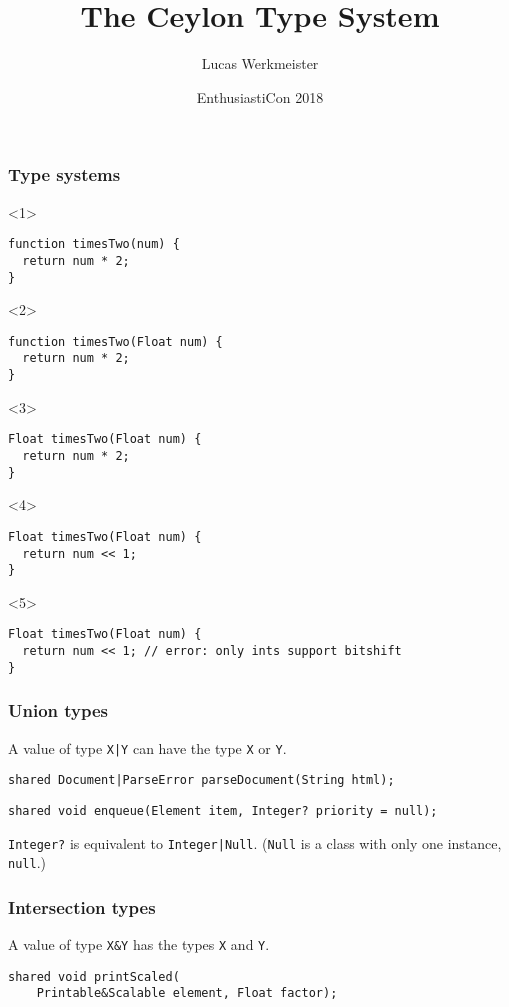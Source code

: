 \documentclass[aspectratio=169]{beamer}
\title{The Ceylon Type System}
\author{Lucas Werkmeister}
\date{EnthusiastiCon 2018}
\begin{document}
\frame{\titlepage}

\begin{frame}[fragile]
  \frametitle{Type systems}
  \begin{onlyenv}<1>
    \begin{lstlisting}
function timesTwo(num) {
  return num * 2;
}
    \end{lstlisting}
  \end{onlyenv}
  \begin{onlyenv}<2>
    \begin{lstlisting}
function timesTwo(Float num) {
  return num * 2;
}
    \end{lstlisting}
  \end{onlyenv}
  \begin{onlyenv}<3>
    \begin{lstlisting}
Float timesTwo(Float num) {
  return num * 2;
}
    \end{lstlisting}
  \end{onlyenv}
  \begin{onlyenv}<4>
    \begin{lstlisting}
Float timesTwo(Float num) {
  return num << 1;
}
    \end{lstlisting}
  \end{onlyenv}
  \begin{onlyenv}<5>
    \begin{lstlisting}
Float timesTwo(Float num) {
  return num << 1; // error: only ints support bitshift
}
    \end{lstlisting}
  \end{onlyenv}
\end{frame}

\begin{frame}[fragile]
  \frametitle{Union types}
  A value of type \lstinline{X|Y} can have the type \lstinline{X} or \lstinline{Y}.
  \pause
  \begin{lstlisting}
shared Document|ParseError parseDocument(String html);
  \end{lstlisting}
  \pause
  \begin{lstlisting}
shared void enqueue(Element item, Integer? priority = null);
  \end{lstlisting}
  \pause
  \lstinline{Integer?} is equivalent to \lstinline{Integer|Null}.
  (\lstinline{Null} is a class with only one instance, \lstinline{null}.)
\end{frame}

\begin{frame}[fragile]
  \frametitle{Intersection types}
  A value of type \lstinline{X&Y} has the types \lstinline{X} and \lstinline{Y}.
  \pause
  \begin{lstlisting}
shared void printScaled(
    Printable&Scalable element, Float factor);
  \end{lstlisting}
\end{frame}
\end{document}
